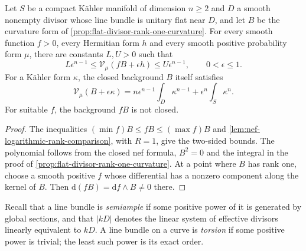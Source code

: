 \begin{corollary}\label{cor:flat-divisor-variational-order}
Let $S$ be a compact K\"ahler manifold of dimension $n\geq2$ and $D$ a smooth nonempty divisor whose line bundle is unitary flat near $D$, and let $B$ be the curvature form of \cref{prop:flat-divisor-rank-one-curvature}. For every smooth function $f>0$, every Hermitian form $h$ and every smooth positive probability form $\mu$, there are constants $L,U>0$ such that
\[
 L\epsilon^{n-1}\leq\mathcal V_\mu(fB+\epsilon h)
              \leq U\epsilon^{n-1},\qquad0<\epsilon\leq1.
\]
For a K\"ahler form $\kappa$, the closed background $B$ itself satisfies
\[
 \mathcal V_\mu(B+\epsilon\kappa)
 =n\epsilon^{n-1}\int_D\kappa^{n-1}+\epsilon^n\int_S\kappa^n.
\]
For suitable $f$, the background $fB$ is not closed.
\end{corollary}
\begin{proof}
The inequalities $(\min f)B\leq fB\leq(\max f)B$ and \cref{lem:nef-logarithmic-rank-comparison}, with $R=1$, give the two-sided bounds. The polynomial follows from the closed nef formula, $B^2=0$ and the integral in the proof of \cref{prop:flat-divisor-rank-one-curvature}. At a point where $B$ has rank one, choose a smooth positive $f$ whose differential has a nonzero component along the kernel of $B$. Then $\mathrm d(fB)=\mathrm df\wedge B\ne0$ there.
\end{proof}

Recall that a line bundle is \emph{semiample} if some positive power of it is generated by global sections, and that $|kD|$ denotes the linear system of effective divisors linearly equivalent to $kD$. A line bundle on a curve is \emph{torsion} if some positive power is trivial; the least such power is its exact order.

